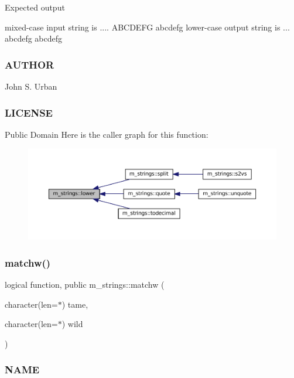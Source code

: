 Expected output \begin{DoxyVerb}mixed-case input string is .... ABCDEFG abcdefg
lower-case output string is ... abcdefg abcdefg
\end{DoxyVerb}
 \subsubsection*{A\+U\+T\+H\+OR}

John S. Urban \subsubsection*{L\+I\+C\+E\+N\+SE}

Public Domain Here is the caller graph for this function\+:
\nopagebreak
\begin{figure}[H]
\begin{center}
\leavevmode
\includegraphics[width=350pt]{namespacem__strings_a3c7d4be9051206e4b2f72112f9fdc3b4_icgraph}
\end{center}
\end{figure}
\mbox{\label{namespacem__strings_a5f96f66162f0f04d58b4f5dced8e82c6}} 
\subsubsection{\texorpdfstring{matchw()}{matchw()}}
{\footnotesize\ttfamily logical function, public m\+\_\+strings\+::matchw (\begin{DoxyParamCaption}\item[{character(len=$\ast$)}]{tame,  }\item[{character(len=$\ast$)}]{wild }\end{DoxyParamCaption})}



\subsubsection*{N\+A\+ME}

